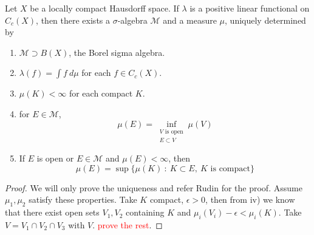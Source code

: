 \begin{theorem}
  Let $X$ be a locally compact Hausdorff space. If $\lambda$ is a positive linear functional on $C_c(X)$, then there exists a $\sigma$-algebra $\mathcal{M}$ and a measure $\mu$, uniquely determined by  
  \begin{enumerate}[label=(\arabic*)]
    \item $\mathcal{M} \supset B(X)$, the Borel sigma algebra.
    \item $\lambda(f) = \int  f \ d \mu$ for each $f \in C_c(X)$.
    \item $\mu(K) < \infty$ for each compact $K$.
    \item for $E \in \mathcal{M}$, \[
        \mu(E) = \inf_{\substack{V \textrm{ is open} \\ E \subset V}} \mu(V)
    \]
  \item If $E$ is open or $E \in \mathcal{M}$ and $\mu(E) < \infty$, then \[
      \mu(E) = \sup \{ \mu(K)  \ : \   K \subset E,\  K \textrm{ is compact} \}
  \]
  \end{enumerate}
\end{theorem}
\begin{proof}
  We will only prove the uniqueness and refer Rudin for the proof. Assume $\mu_{1}, \mu_{2} $ satisfy these properties. Take $K$ compact, $\epsilon > 0$, then from iv) we know that there exist open sets $V_{1} , V_{2} $ containing $K$ and $\mu_i(V_i) - \epsilon < \mu_i(K)$. Take $V = V_{1} \cap V_{2} \cap V_{3} $ with $V$. 
  \textcolor{red}{prove the rest}.
\end{proof}
